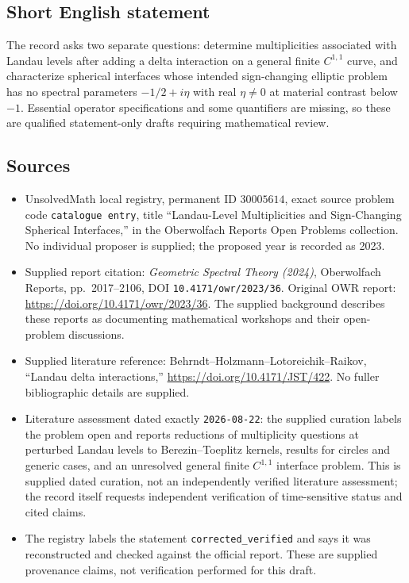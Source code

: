 \documentclass[11pt]{article}
\begin{document}
\subsection{Short English statement}
The record asks two separate questions: determine multiplicities associated with Landau levels after adding a delta interaction on a general finite \(C^{1,1}\) curve, and characterize spherical interfaces whose intended sign-changing elliptic problem has no spectral parameters \(-1/2+i\eta\) with real \(\eta\ne0\) at material contrast below \(-1\). Essential operator specifications and some quantifiers are missing, so these are qualified statement-only drafts requiring mathematical review.
\subsection{Sources}
\begin{itemize}
\item UnsolvedMath local registry, permanent ID \(30005614\), exact source problem code \texttt{catalogue entry}, title ``Landau-Level Multiplicities and Sign-Changing Spherical Interfaces,'' in the Oberwolfach Reports Open Problems collection. No individual proposer is supplied; the proposed year is recorded as 2023.
\item Supplied report citation: \emph{Geometric Spectral Theory (2024)}, Oberwolfach Reports, pp.\ 2017--2106, DOI \texttt{10.4171/owr/2023/36}. Original OWR report: \url{https://doi.org/10.4171/owr/2023/36}. The supplied background describes these reports as documenting mathematical workshops and their open-problem discussions.
\item Supplied literature reference: Behrndt--Holzmann--Lotoreichik--Raikov, ``Landau delta interactions,'' \url{https://doi.org/10.4171/JST/422}. No fuller bibliographic details are supplied.
\item Literature assessment dated exactly \texttt{2026-08-22}: the supplied curation labels the problem open and reports reductions of multiplicity questions at perturbed Landau levels to Berezin--Toeplitz kernels, results for circles and generic cases, and an unresolved general finite \(C^{1,1}\) interface problem. This is supplied dated curation, not an independently verified literature assessment; the record itself requests independent verification of time-sensitive status and cited claims.
\item The registry labels the statement \texttt{corrected\_verified} and says it was reconstructed and checked against the official report. These are supplied provenance claims, not verification performed for this draft.
\end{itemize}
\end{document}
